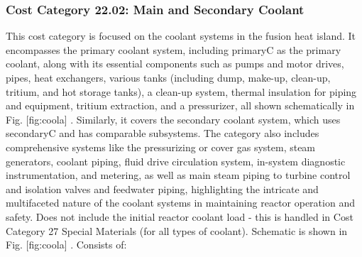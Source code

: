 
\subsubsection{Cost Category 22.02: Main and Secondary Coolant}

This cost category is focused on the coolant systems in the fusion heat island. It encompasses the primary coolant system, including primaryC as the primary coolant, along with its essential components such as pumps and motor drives, pipes, heat exchangers, various tanks (including dump, make-up, clean-up, tritium, and hot storage tanks), a clean-up system, thermal insulation for piping and equipment, tritium extraction, and a pressurizer, all shown schematically in Fig. [fig:coola]
. Similarly, it covers the secondary coolant system, which uses secondaryC and has comparable subsystems.  The category also includes comprehensive systems like the pressurizing or cover gas system, steam generators, coolant piping, fluid drive circulation system, in-system diagnostic instrumentation, and metering, as well as main steam piping to turbine control and isolation valves and feedwater piping, highlighting the intricate and multifaceted nature of the coolant systems in maintaining reactor operation and safety.  Does not include the initial reactor coolant load - this is handled in  Cost Category 27 Special Materials (for all types of coolant). Schematic is shown in Fig. [fig:coola]
. Consists of:

